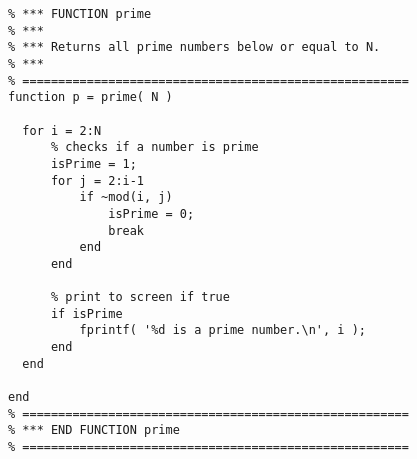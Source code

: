 \begin{lstlisting}[framerule=2pt,rulecolor=\color{goodgreen},float,caption={The same code as in listing~\ref{listing:prime1}, with rules of style applied. It should now be somewhat easier to maintain and improve the code. Do you have ideas how to speed it up?}]
% ======================================================
% *** FUNCTION prime
% ***
% *** Returns all prime numbers below or equal to N.
% ***
% ======================================================
function p = prime( N )

  for i = 2:N
      % checks if a number is prime
      isPrime = 1;
      for j = 2:i-1
          if ~mod(i, j)
              isPrime = 0;
              break
          end
      end

      % print to screen if true
      if isPrime
          fprintf( '%d is a prime number.\n', i );
      end
  end

end
% ======================================================
% *** END FUNCTION prime
% ======================================================
\end{lstlisting}

